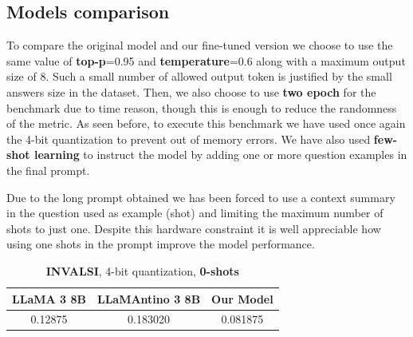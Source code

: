 \documentclass{article}
\begin{document}
	\subsection{Models comparison}
	To compare the original model and our fine-tuned version we choose to use the same value of \textbf{top-p}=0.95 and \textbf{temperature}=0.6 along with a maximum output size of 8. Such a small number of allowed output token is justified by the small answers size in the dataset. 
	Then, we also choose to use \textbf{two epoch} for the benchmark due to time reason, though this is enough to reduce the randomness of the metric.
	As seen before, to execute this benchmark we have used once again the 4-bit quantization to prevent out of memory errors.
	We have also used \textbf{few-shot learning} to instruct the model by adding one or more question examples in the final prompt.
	\begin{center}
	\end{center}
	Due to the long prompt obtained we has been forced to use a context summary in the question used as example (shot) and limiting the maximum number of shots to just one. 
	Despite this hardware constraint it is well appreciable how using one shots in the prompt improve the model performance. 
	
	\begin{table}[h]
		\center
		\begin{tabular}{ccc}
			\toprule
			\textbf{LLaMA 3 8B} & \textbf{LLaMAntino 3 8B} & \textbf{Our Model} \\
			\midrule
			0.12875 & 0.183020 & 0.081875 \\
			\bottomrule
		\end{tabular}
		\caption{\textbf{INVALSI}, 4-bit quantization, \textbf{0-shots}}
	\end{table} 
	
\end{document}
